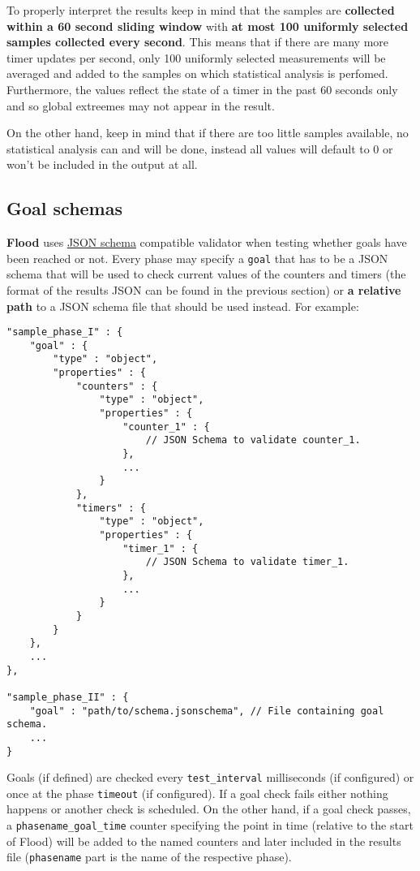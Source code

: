 \documentclass[a4paper]{article}
\begin{document}
\noindent
To properly interpret the results keep in mind that the samples are \textbf{collected within a 60 second sliding window} with \textbf{at most 100 uniformly selected samples collected every second}. This means that if there are many more timer updates per second, only 100 uniformly selected measurements will be averaged and added to the samples on which statistical analysis is perfomed. Furthermore, the values reflect the state of a timer in the past 60 seconds only and so global extreemes may not appear in the result.

\noindent
On the other hand, keep in mind that if there are too little samples available, no statistical analysis can and will be done, instead all values will default to 0 or won't be included in the output at all.
\subsection{Goal schemas}
\label{sec-4-2}
\label{ref-goal_schemas}

\textbf{Flood} uses \href{http://json-schema.org/}{JSON schema} compatible validator when testing whether goals have been reached or not. Every phase may specify a \texttt{goal} that has to be a JSON schema that will be used to check current values of the counters and timers (the format of the results JSON can be found in the previous section) or \textbf{a relative path} to a JSON schema file that should be used instead. For example:


\begin{verbatim}
"sample_phase_I" : {
    "goal" : {
        "type" : "object",
        "properties" : {
            "counters" : {
                "type" : "object",
                "properties" : {
                    "counter_1" : {
                        // JSON Schema to validate counter_1.
                    },
                    ...
                }
            },
            "timers" : {
                "type" : "object",
                "properties" : {
                    "timer_1" : {
                        // JSON Schema to validate timer_1.
                    },
                    ...
                }
            }
        }
    },
    ...
},

"sample_phase_II" : {
    "goal" : "path/to/schema.jsonschema", // File containing goal schema.
    ...
}
\end{verbatim}




\noindent
Goals (if defined) are checked every \texttt{test\_interval} milliseconds (if configured) or once at the phase \texttt{timeout} (if configured). If a goal check fails either nothing happens or another check is scheduled. On the other hand, if a goal check passes, a \texttt{phasename\_goal\_time} counter specifying the point in time (relative to the start of Flood) will be added to the named counters and later included in the results file (\texttt{phasename} part is the name of the respective phase).
\end{document}

